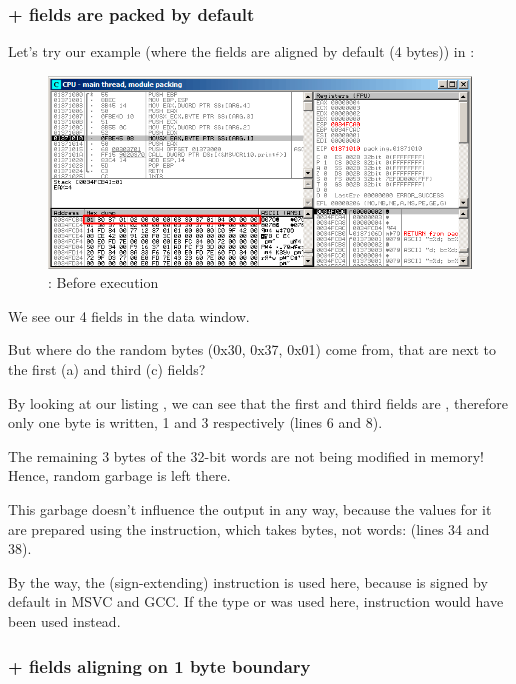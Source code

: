 ﻿\clearpage
\subsubsection{\olly + fields are packed by default}
\myindex{\olly}

Let's try our example (where the fields are aligned by default (4 bytes)) in \olly:

\begin{figure}[H]
\centering
\includegraphics[scale=\FigScale]{patterns/15_structs/4_packing/olly_packing_4.png}
\caption{\olly: Before \printf execution}
\label{fig:packing_olly_4}
\end{figure}

We see our 4 fields in the data window.

But where do the random bytes (0x30, 0x37, 0x01) come from, that are next to the first (a) and third (c) fields?

By looking at our listing , we can see that the first and third fields
are \Tchar, therefore only one byte is written, 1 and 3 respectively (lines 6 and 8).

The remaining 3 bytes of the 32-bit words are not being modified in memory!
Hence, random garbage is left there.

This garbage doesn't influence the \printf output in any way, because the values for it are prepared
using the \MOVSX instruction, which takes bytes, not words: 
 (lines 34 and 38).

By the way, the \MOVSX (sign-extending) instruction is used here, because 
\Tchar is signed by default in MSVC and GCC.
If the type  or  was used here, 
\MOVZX instruction would have been used instead.

\clearpage
\subsubsection{\olly + fields aligning on 1 byte boundary}
\myindex{\olly}

